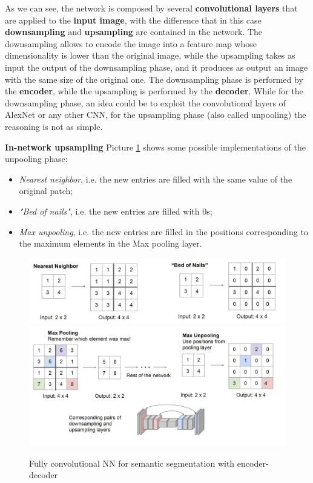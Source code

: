 As we can see, the network is composed by several \textbf{convolutional layers} that are applied to the \textbf{input image}, with the difference that in this case \textbf{downsampling} and \textbf{upsampling} are contained in the network. The downsampling allows to encode the image into a feature map whose dimensionality is lower than the original image, while the upsampling takes as input the output of the downsampling phase, and it produces as output an image with the same size of the original one. The downsampling phase is performed by the \textbf{encoder}, while the upsampling is performed by the \textbf{decoder}. While for the downsampling phase, an idea could be to exploit the convolutional layers of AlexNet or any other CNN, for the upsampling phase (also called unpooling) the reasoning is not as simple.

\textbf{In-network upsampling}
Picture \ref{unpooling} shows some possible implementations of the unpooling phase:

\begin{itemize}
    \item \textit{Nearest neighbor}, i.e. the new entries are filled with the same value of the original patch;
    \item \textit{"Bed of nails"}, i.e. the new entries are filled with 0s;
    \item \textit{Max unpooling}, i.e. the new entries are filled in the positions corresponding to the maximum elements in the Max pooling layer.
\end{itemize}

\begin{figure}[h!]
		\centering
        \includegraphics[scale = 1.0]{img/unpooling1.jpg}
        \includegraphics[scale = 1.0]{img/unpooling2.jpg}
		\label{unpooling}
        \caption{Fully convolutional NN for semantic segmentation with encoder-decoder}
\end{figure}

